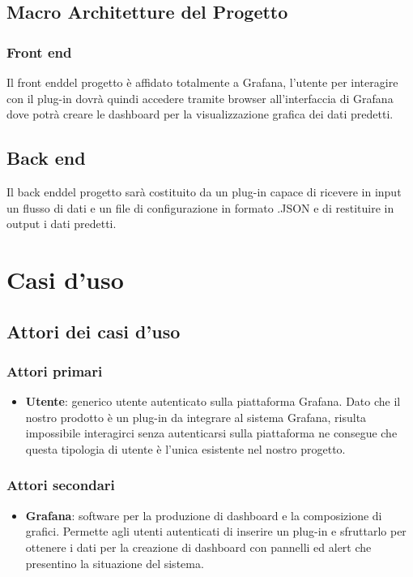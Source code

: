 	\subsection{Macro Architetture del Progetto}
		\subsubsection{Front end}
		Il front end\glosp del progetto è affidato totalmente a Grafana, l'utente per interagire con il plug-in dovrà quindi accedere tramite browser all'interfaccia di Grafana dove potrà creare le dashboard per la visualizzazione grafica dei dati predetti. 
		\subsection{Back end}
		Il back end\glosp del progetto sarà costituito da un plug-in capace di ricevere in input un flusso di dati e un file di configurazione in formato .JSON e di restituire in output i dati predetti.
\section{Casi d'uso}
	\subsection{Attori dei casi d'uso}
		\subsubsection{Attori primari}
		\begin{itemize}
			\item \textbf{Utente}: generico utente autenticato sulla piattaforma Grafana. Dato che il nostro prodotto è un plug-in da integrare al sistema Grafana, risulta impossibile interagirci senza autenticarsi sulla piattaforma ne consegue che questa tipologia di utente è l'unica esistente nel nostro progetto.
		\end{itemize}
		\subsubsection{Attori secondari}
		\begin{itemize}
			\item \textbf{Grafana}: software per la produzione di dashboard e la composizione di grafici. Permette agli utenti autenticati di inserire un plug-in e sfruttarlo per ottenere i dati per la creazione di dashboard con pannelli ed alert che presentino la situazione del sistema.
		\end{itemize}
